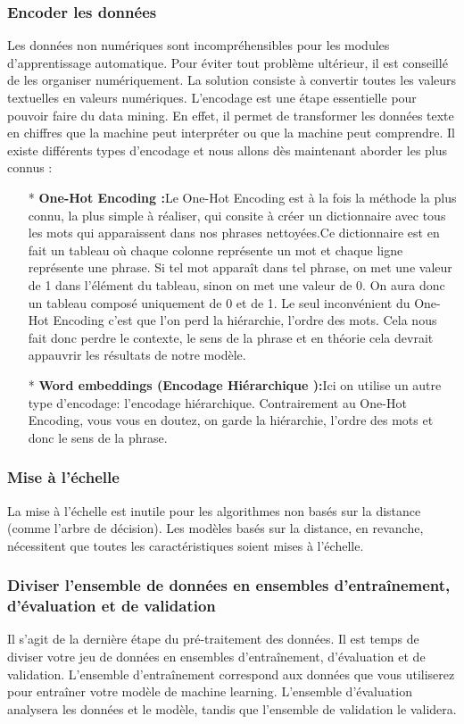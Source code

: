 \documentclass[a4paper, 12pt]{article}
\begin{document}
	\subsubsection{Encoder les données }Les données non numériques sont incompréhensibles pour les modules d'apprentissage automatique. Pour éviter tout problème ultérieur, il est conseillé de les organiser numériquement. La solution consiste à convertir toutes les valeurs textuelles en valeurs numériques. L’encodage est une étape essentielle pour pouvoir faire du data mining. En effet, il permet de transformer les données texte en chiffres que la machine peut interpréter ou que la machine peut comprendre. Il existe différents types d’encodage et nous allons dès maintenant aborder les plus connus :
	\begin{itemize}
		\item[*] \textbf{One-Hot Encoding :}Le One-Hot Encoding est à la fois la méthode la plus connu, la plus simple à réaliser, qui consite à créer un dictionnaire avec tous les mots qui apparaissent dans nos phrases nettoyées.Ce dictionnaire est en fait un tableau où chaque colonne représente un mot et chaque ligne représente une phrase.
		Si tel mot apparaît dans tel phrase, on met une valeur de 1 dans l’élément du tableau, sinon on met une valeur de 0.
		On aura donc un tableau composé uniquement de 0 et de 1.
		Le seul inconvénient du One-Hot Encoding c’est que l’on perd la hiérarchie, l’ordre des mots. Cela nous fait donc perdre le contexte, le sens de la phrase et en théorie cela devrait appauvrir les résultats de notre modèle.
		\item[*] \textbf{Word embeddings (Encodage Hiérarchique ):}Ici on utilise un autre type d’encodage: l’encodage hiérarchique.
		Contrairement au One-Hot Encoding, vous vous en doutez, on garde la hiérarchie, l’ordre des mots et donc le sens de la phrase.
	\end{itemize}
	\subsubsection{Mise à l'échelle}La mise à l'échelle est inutile pour les algorithmes non basés sur la distance (comme l'arbre de décision). Les modèles basés sur la distance, en revanche, nécessitent que toutes les caractéristiques soient mises à l'échelle.

	
	\subsubsection{Diviser l'ensemble de données en ensembles d'entraînement, d'évaluation et de validation}Il s'agit de la dernière étape du pré-traitement des données. Il est temps de diviser votre jeu de données en ensembles d'entraînement, d'évaluation et de validation. L'ensemble d'entraînement correspond aux données que vous utiliserez pour entraîner votre modèle de machine learning. L'ensemble d'évaluation analysera les données et le modèle, tandis que l'ensemble de validation le validera.
\end{document}
